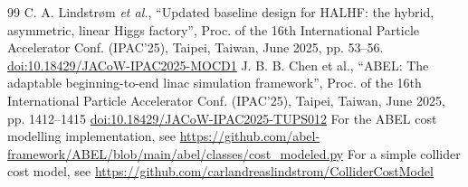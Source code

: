 \documentclass[%
               refpage       %
               hyphens,      %
               ]{jacow}
\begin{document}
\begin{thebibliography}{99}
C. A. Lindstr{\o}m \textit{et al.}, “Updated baseline design for HALHF: the hybrid, asymmetric, linear Higgs factory”, Proc. of the 16th International Particle Accelerator Conf. (IPAC’25), Taipei, Taiwan, June 2025, pp. 53--56. \url{doi:10.18429/JACoW-IPAC2025-MOCD1}
J. B. B. Chen et al., “ABEL: The adaptable beginning-to-end linac simulation framework”, Proc. of the 16th International Particle Accelerator Conf. (IPAC’25), Taipei, Taiwan,
June 2025, pp. 1412--1415 \url{doi:10.18429/JACoW-IPAC2025-TUPS012}
For the ABEL cost modelling implementation, see
\url{https://github.com/abel-framework/ABEL/blob/main/abel/classes/cost_modeled.py}
For a simple collider cost model, see \url{https://github.com/carlandreaslindstrom/ColliderCostModel}

\end{thebibliography}

\end{document}

